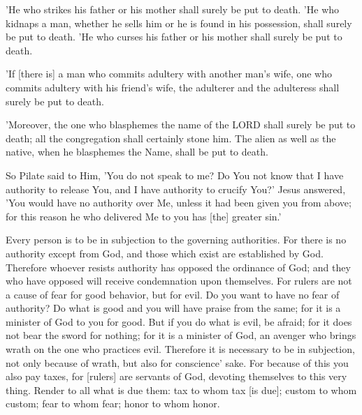 \begin{scripture}[Exodus 21:15-17]
    'He who strikes his father or his mother shall surely be put to death.
    'He who kidnaps a man, whether he sells him or he is found in his possession, shall surely be put to death.
    'He who curses his father or his mother shall surely be put to death.
\end{scripture}

\begin{scripture}[Leviticus 20:10]
    'If [there is] a man who commits adultery with another man's wife, one who commits adultery with his friend's wife, the adulterer and the adulteress shall surely be put to death.
\end{scripture}

\begin{scripture}[Leviticus 24:16]
    'Moreover, the one who blasphemes the name of the LORD shall surely be put to death; all the congregation shall certainly stone him. The alien as well as the native, when he blasphemes the Name, shall be put to death.
\end{scripture}

\begin{scripture}[John 19:10-11]
    So Pilate said to Him, 'You do not speak to me? Do You not know that I have authority to release You, and I have authority to crucify You?'
    Jesus answered, 'You would have no authority over Me, unless it had been given you from above; for this reason he who delivered Me to you has [the] greater sin.'
\end{scripture}

\begin{scripture}[Romans 13:1-7]
    Every person is to be in subjection to the governing authorities. For there is no authority except from God, and those which exist are established by God.
    Therefore whoever resists authority has opposed the ordinance of God; and they who have opposed will receive condemnation upon themselves.
    For rulers are not a cause of fear for good behavior, but for evil. Do you want to have no fear of authority? Do what is good and you will have praise from the same;
    for it is a minister of God to you for good. But if you do what is evil, be afraid; for it does not bear the sword for nothing; for it is a minister of God, an avenger who brings wrath on the one who practices evil.
    Therefore it is necessary to be in subjection, not only because of wrath, but also for conscience' sake.
    For because of this you also pay taxes, for [rulers] are servants of God, devoting themselves to this very thing.
    Render to all what is due them: tax to whom tax [is due]; custom to whom custom; fear to whom fear; honor to whom honor.
\end{scripture}

